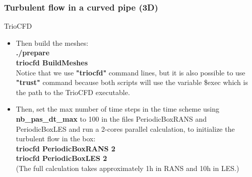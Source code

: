 \documentclass[10pt, hyperref={unicode=true,pdfusetitle, bookmarks=true,bookmarksnumbered=false,bookmarksopen=false, breaklinks=false,pdfborder={0 0l 1},backref=true,colorlinks=true,linkcolor=darkblue,pageanchor}]{beamer}
\begin{document}
\begin{frame}
\frametitle{Turbulent flow in a curved pipe (3D)}
\begin{block}{TrioCFD}

\begin{itemize}
\item Then build the meshes:\\
\textbf{./prepare} \\
\textbf{triocfd BuildMeshes} \\
Notice that we use \textbf{"triocfd"} command lines, but it is also possible to use \textbf{"trust"} command because both scripts will use the variable \$exec which is the path to the TrioCFD executable.


\item Then, set the max number of time steps in the time scheme using \textbf{nb\_pas\_dt\_max} to 100 in the files PeriodicBoxRANS and PeriodicBoxLES and run a 2-cores parallel calculation, to initialize the turbulent flow in the box: \\
\textbf{triocfd PeriodicBoxRANS 2} \\
\textbf{triocfd PeriodicBoxLES 2} \\
(The full calculation takes approximately 1h in RANS and 10h in LES.)
\end{itemize}

\end{block}
\end{frame}
\end{document}
